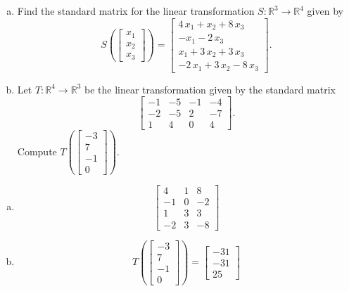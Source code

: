 
\begin{exerciseStatement}

\begin{enumerate}[(a)]
\item Find the standard matrix for the linear transformation \(S:\mathbb{R}^ 3  \to \mathbb{R}^ 4 \) given by \[S\left(  \left[\begin{array}{c}
x_{1} \\
x_{2} \\
x_{3}
\end{array}\right]  \right) =  \left[\begin{array}{c}
4 \, x_{1} + x_{2} + 8 \, x_{3} \\
-x_{1} - 2 \, x_{3} \\
x_{1} + 3 \, x_{2} + 3 \, x_{3} \\
-2 \, x_{1} + 3 \, x_{2} - 8 \, x_{3}
\end{array}\right] .\]
\item Let \(T:\mathbb{R}^ 4  \to \mathbb{R}^ 3 \) be the linear transformation given by the standard matrix \[ \left[\begin{array}{cccc}
-1 & -5 & -1 & -4 \\
-2 & -5 & 2 & -7 \\
1 & 4 & 0 & 4
\end{array}\right] .\] Compute \(T\left( \left[\begin{array}{c}
-3 \\
7 \\
-1 \\
0
\end{array}\right]  \right)\). 
\end{enumerate}
    
\end{exerciseStatement}
    
\begin{exerciseAnswer} 

\begin{enumerate}[(a)]
\item \[ \left[\begin{array}{ccc}
4 & 1 & 8 \\
-1 & 0 & -2 \\
1 & 3 & 3 \\
-2 & 3 & -8
\end{array}\right] \]
\item \[T\left( \left[\begin{array}{c}
-3 \\
7 \\
-1 \\
0
\end{array}\right]  \right)= \left[\begin{array}{c}
-31 \\
-31 \\
25
\end{array}\right] \]
\end{enumerate}
    
\end{exerciseAnswer}
    
